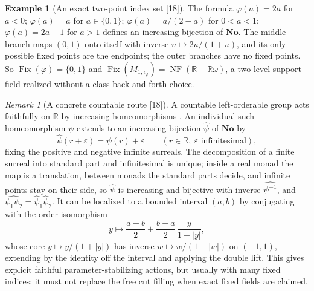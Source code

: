 \documentclass[11pt,oneside]{article}
\numberwithin{equation}{section}
\theoremstyle{definition}
\newtheorem{example}[example]{Example}
\theoremstyle{remark}
\newtheorem{remark}[remark]{Remark}
\newcommand{\No}{\mathbf{No}}
\newcommand{\R}{\mathbb R}
\newcommand{\Fix}{\operatorname{Fix}}
\newcommand{\src}[1]{\textup{\textsf{\small[#1]}}}
\newcommand{\NF}{\operatorname{NF}}
\begin{document}
\begin{example}[An exact two-point index set \src{18}]\label{opa:es:ex:twopoints}
The formula $\varphi(a)=2a$ for $a<0$; $\varphi(a)=a$ for $a\in\{0,1\}$; $\varphi(a)=a/(2-a)$ for $0<a<1$; $\varphi(a)=2a-1$ for $a>1$ defines an
increasing bijection of $\No$. The middle branch maps $(0,1)$ onto itself with inverse $u\mapsto2u/(1+u)$, and its only possible fixed
points are the endpoints; the outer branches have no fixed points. So $\Fix(\varphi)=\{0,1\}$ and $\Fix(M_{1,\iota_\varphi})=\NF(\R+\R\omega)$, a
two-level support field realized without a class back-and-forth choice.
\end{example}

\begin{remark}[A concrete countable route \src{18}]\label{opa:es:rem:countable}
A countable left-orderable group acts faithfully on $\R$ by increasing homeomorphisms \cite[Proposition~1.1]{Rivas}. An individual such
homeomorphism $\psi$ extends to an increasing bijection $\widehat\psi$ of $\No$ by
\begin{equation}\label{opa:es:eq:extension}
 \widehat\psi(r+\varepsilon)=\psi(r)+\varepsilon\qquad(r\in\R,\ \varepsilon\text{ infinitesimal}),
\end{equation}
fixing the positive and negative infinite surreals. The decomposition of a finite surreal into standard part and infinitesimal is unique;
inside a real monad the map is a translation, between monads the standard parts decide, and infinite points stay on their side, so
$\widehat\psi$ is increasing and bijective with inverse $\widehat{\psi^{-1}}$, and $\widehat{\psi_1\psi_2}=\widehat\psi_1\widehat\psi_2$. It can be localized
to a bounded interval $(a,b)$ by conjugating with the order isomorphism
\begin{equation}\label{opa:es:eq:localcoordinate}
 y\longmapsto\frac{a+b}2+\frac{b-a}2\,\frac{y}{1+|y|},
\end{equation}
whose core $y\mapsto y/(1+|y|)$ has inverse $w\mapsto w/(1-|w|)$ on $(-1,1)$, extending by the identity off the interval and applying the
double lift. This gives explicit faithful parameter-stabilizing actions, but usually with many fixed indices; it must not replace the free
cut filling when exact fixed fields are claimed.
\end{remark}
\end{document}
